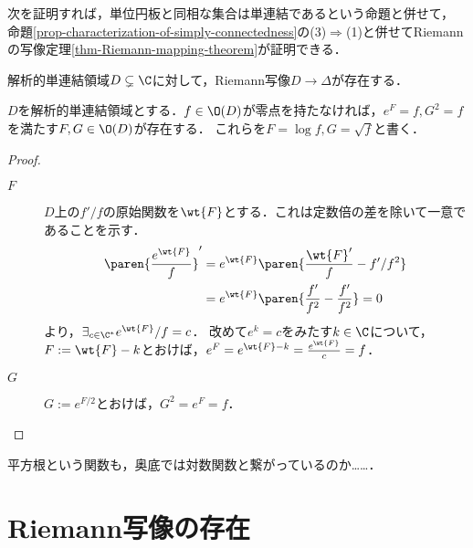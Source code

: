 \documentclass[uplatex, dvipdfmx]{jsreport}
\begin{document}
次を証明すれば，単位円板と同相な集合は単連結であるという命題と併せて，
命題\ref{prop-characterization-of-simply-connectedness}の(3)$\Rightarrow$(1)と併せてRiemannの写像定理\ref{thm-Riemann-mapping-theorem}が証明できる．
\begin{theorem}
    解析的単連結領域$D\subsetneq\C$に対して，Riemann写像$D\to\Delta$が存在する．
\end{theorem}
\begin{lemma}[logと平方根の存在]\label{lemma-existence-of-log}
    $D$を解析的単連結領域とする．$f\in\O(D)$が零点を持たなければ，$e^F=f,G^2=f$を満たす$F,G\in\O(D)$が存在する．
    これらを$F=\log f,G=\sqrt{f}$と書く．
\end{lemma}
\begin{proof}
    \begin{description}
        \item[$F$] $D$上の$f'/f$の原始関数を$\wt{F}$とする．これは定数倍の差を除いて一意であることを示す．
        \begin{align*}
            \paren{\frac{e^{\wt{F}}}{f}}'&=e^{\wt{F}}\paren{\frac{\wt{F}'}{f}-f'/f^2}\\
            &=e^{\wt{F}}\paren{\frac{f'}{f^2}-\frac{f'}{f^2}}=0
        \end{align*}
        より，$\exists_{c\in\C^*}e^{\wt{F}}/f=c$．
        改めて$e^k=c$をみたす$k\in\C$について，$F:=\wt{F}-k$とおけば，$e^F=e^{\wt{F}-k}=\frac{e^{\wt{F}}}{c}=f$．
        \item[$G$]
        $G:=e^{F/2}$とおけば，$G^2=e^F=f$．
    \end{description}
\end{proof}
\begin{remarks}
    平方根という関数も，奥底では対数関数と繋がっているのか……．
\end{remarks}

\section{Riemann写像の存在}
\end{document}
